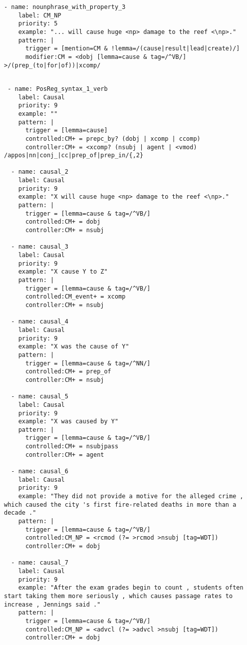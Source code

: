 \begin{singlespace}
\begin{lstlisting}[caption={Rules for extracting causal mentions (CMs), which are the potential arguments for causal events.}]
  - name: nounphrase_with_property_3
    label: CM_NP
    priority: 5
    example: "... will cause huge <np> damage to the reef <\np>."
    pattern: |
      trigger = [mention=CM & !lemma=/(cause|result|lead|create)/]
      modifier:CM = <dobj [lemma=cause & tag=/^VB/] >/(prep_(to|for|of))|xcomp/
\end{lstlisting}

\begin{lstlisting}[caption={Rules for causal relations (events).  Note that the cause and effect arguments are previously found causal mentions.}] 

 - name: PosReg_syntax_1_verb
    label: Causal    
    priority: 9
    example: ""
    pattern: |
      trigger = [lemma=cause]
      controlled:CM+ = prepc_by? (dobj | xcomp | ccomp) 
      controller:CM+ = <xcomp? (nsubj | agent | <vmod) /appos|nn|conj_|cc|prep_of|prep_in/{,2}

  - name: causal_2
    label: Causal
    priority: 9
    example: "X will cause huge <np> damage to the reef <\np>."
    pattern: |
      trigger = [lemma=cause & tag=/^VB/]
      controlled:CM+ = dobj 
      controller:CM+ = nsubj

  - name: causal_3
    label: Causal
    priority: 9
    example: "X cause Y to Z"
    pattern: |
      trigger = [lemma=cause & tag=/^VB/]
      controlled:CM_event+ = xcomp 
      controller:CM+ = nsubj

  - name: causal_4
    label: Causal
    priority: 9
    example: "X was the cause of Y"
    pattern: |
      trigger = [lemma=cause & tag=/^NN/]
      controlled:CM+ = prep_of
      controller:CM+ = nsubj

  - name: causal_5
    label: Causal
    priority: 9
    example: "X was caused by Y"
    pattern: |
      trigger = [lemma=cause & tag=/^VB/]
      controlled:CM+ = nsubjpass
      controller:CM+ = agent

  - name: causal_6
    label: Causal
    priority: 9
    example: "They did not provide a motive for the alleged crime , which caused the city 's first fire-related deaths in more than a decade ."
    pattern: |
      trigger = [lemma=cause & tag=/^VB/]
      controlled:CM_NP = <rcmod (?= >rcmod >nsubj [tag=WDT])
      controller:CM+ = dobj

  - name: causal_7
    label: Causal
    priority: 9
    example: "After the exam grades begin to count , students often start taking them more seriously , which causes passage rates to increase , Jennings said ."
    pattern: |
      trigger = [lemma=cause & tag=/^VB/]
      controlled:CM_NP = <advcl (?= >advcl >nsubj [tag=WDT])
      controller:CM+ = dobj



\end{lstlisting}
\end{singlespace}
